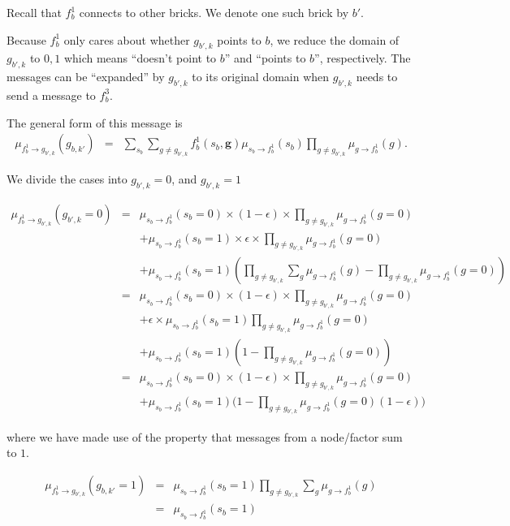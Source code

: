 \documentclass[11pt]{article}
\newcommand{\fb}[1]{f_b^{#1}}
\newcommand{\mSbFb}[1]{\mu_{s_{b} \rightarrow \fb{#1}}}
\begin{document}
Recall that $\fb1$ connects to other bricks. We denote one such brick by $b'$.

Because $\fb1$ only cares about whether $g_{b',k}$ points to $b$, we reduce the domain of $g_{b',k}$ to $0,1$ which means ``doesn't point to $b$'' and ``points to $b$'', respectively. The messages can be ``expanded'' by $g_{b',k}$ to its original domain when $g_{b',k}$ needs to send a message to $\fb3$.

The general form of this message is
\begin{eqnarray}
\mu_{\fb1 \rightarrow g_{b',k}}(g_{b,k'}) &=& \sum_{s_b} \sum_{g \neq g_{b',k}} \fb1(s_b,\mathbf{g}) \mSbFb1(s_b) \prod_{g \neq g_{b',k}} \mu_{g \rightarrow \fb1}(g).
\end{eqnarray}

We divide the cases into  $g_{b',k}=0$, and  $g_{b',k}=1$

\begin{eqnarray}
\mu_{\fb1 \rightarrow g_{b',k}}(g_{b',k}=0) &=& \mSbFb1(s_b=0) \times (1-\epsilon)  \times   \prod_{g \neq g_{b',k}}\mu_{g \rightarrow \fb1}(g=0) \\
& & +  \mSbFb1(s_b=1) \times \epsilon \times \prod_{g \neq g_{b',k}}\mu_{g \rightarrow \fb1}(g=0) \nonumber \\
& & +  \mSbFb1(s_b=1) (\prod_{g \neq g_{b',k}}\sum_{g} \mu_{g \rightarrow \fb1}(g) - \prod_{g \neq g_{b',k}} \mu_{g \rightarrow \fb1}(g=0) )  \nonumber \\
%
&=&  \mSbFb1(s_b=0) \times (1-\epsilon)  \times  \prod_{g \neq g_{b',k}}\mu_{g \rightarrow \fb1}(g=0) \\
& & + \epsilon \times \mSbFb1(s_b=1) \prod_{g \neq g_{b',k}}\mu_{g \rightarrow \fb1}(g=0) \nonumber \\
& & +  \mSbFb1(s_b=1) (1 - \prod_{g \neq g_{b',k}} \mu_{g \rightarrow \fb1}(g=0)) \nonumber \\
%
&=& \mSbFb1(s_b=0) \times (1-\epsilon)  \times  \prod_{g \neq g_{b',k}}\mu_{g \rightarrow \fb1}(g=0) \nonumber \\
& & +  \mSbFb1(s_b=1) \big( 1- \prod_{g \neq g_{b',k}} \mu_{g \rightarrow \fb1}(g=0)  (1-\epsilon)  \big)
\end{eqnarray}

where we have made use of the property that messages from a node/factor sum to $1$. 

\begin{eqnarray}
\mu_{\fb1 \rightarrow g_{b',k}}(g_{b,k'}=1) &=& \mSbFb1(s_b=1) \prod_{g \neq g_{b',k}} \sum_{g}  \mu_{g \rightarrow \fb1}(g) \\
&=&  \mSbFb1(s_b=1) 
\end{eqnarray}
\end{document}
